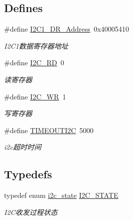 \subsection*{\-Defines}
\begin{DoxyCompactItemize}
\item 
\hypertarget{group___i2_c_gabf2bd419e88218ef9ad3a3a7dd2b145c}{\#define \hyperlink{group___i2_c_gabf2bd419e88218ef9ad3a3a7dd2b145c}{\-I2\-C1\-\_\-\-D\-R\-\_\-\-Address}~0x40005410}\label{group___i2_c_gabf2bd419e88218ef9ad3a3a7dd2b145c}

\begin{DoxyCompactList}\small\item\em \-I2\-C1数据寄存器地址 \end{DoxyCompactList}\item 
\hypertarget{group___i2_c_gacb13e35c5e812ea51d29e833be1b72be}{\#define \hyperlink{group___i2_c_gacb13e35c5e812ea51d29e833be1b72be}{\-I2\-C\-\_\-\-R\-D}~0}\label{group___i2_c_gacb13e35c5e812ea51d29e833be1b72be}

\begin{DoxyCompactList}\small\item\em 读寄存器 \end{DoxyCompactList}\item 
\hypertarget{group___i2_c_ga5a3e7b03fa275ec2d334e95a2caf6477}{\#define \hyperlink{group___i2_c_ga5a3e7b03fa275ec2d334e95a2caf6477}{\-I2\-C\-\_\-\-W\-R}~1}\label{group___i2_c_ga5a3e7b03fa275ec2d334e95a2caf6477}

\begin{DoxyCompactList}\small\item\em 写寄存器 \end{DoxyCompactList}\item 
\hypertarget{group___i2_c_ga7c7e0c31bae2ea1fef32d39d61c61166}{\#define \hyperlink{group___i2_c_ga7c7e0c31bae2ea1fef32d39d61c61166}{\-T\-I\-M\-E\-O\-U\-T\-I2\-C}~5000}\label{group___i2_c_ga7c7e0c31bae2ea1fef32d39d61c61166}

\begin{DoxyCompactList}\small\item\em i2c超时时间 \end{DoxyCompactList}\end{DoxyCompactItemize}
\subsection*{\-Typedefs}
\begin{DoxyCompactItemize}
\item 
\hypertarget{group___i2_c_gaed499a25832ba009a4a212e310ddac45}{typedef enum \hyperlink{group___i2_c_ga3acd3f8324118cb8c44f79b0fa24190a}{i2c\-\_\-state} \hyperlink{group___i2_c_gaed499a25832ba009a4a212e310ddac45}{\-I2\-C\-\_\-\-S\-T\-A\-T\-E}}\label{group___i2_c_gaed499a25832ba009a4a212e310ddac45}

\begin{DoxyCompactList}\small\item\em \-I2\-C收发过程状态 \end{DoxyCompactList}\end{DoxyCompactItemize}
